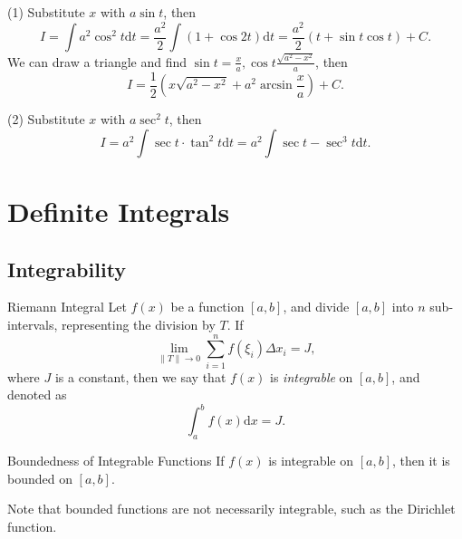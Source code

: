 \begin{solution}
  (1) Substitute $x$ with $a \sin t$, then
  \begin{equation}
    I = \int a^2 \cos^2 t \mathrm{d} t
    = \frac{a^2}{2} \int(1 + \cos 2t)\mathrm{d} t
    = \frac{a^2}{2} (t + \sin t \cos t) + C.
  \end{equation}
  We can draw a triangle and find $\sin t = \frac{x}{a}, \cos t \frac{\sqrt{a^2
      - x^2}}{a}$, then
  \begin{equation}
    I = \frac{1}{2} (x \sqrt{a^2 - x^2} + a^2 \arcsin \frac{x}{a}) + C.
  \end{equation}

  (2) Substitute $x$ with $a\sec^2 t$, then 
  \begin{equation}
    I = a^2 \int \sec t \cdot \tan^2 t \mathrm{d} t
    = a^2 \int \sec t - \sec^3 t \mathrm{d} t.
  \end{equation}
\end{solution}


\section{Definite Integrals}

\subsection{Integrability}

\begin{definition}{Riemann Integral}{}
  Let $f(x)$ be a function $[a, b]$, and divide $[a, b]$ into $n$ sub-intervals,
  representing the division by $T$.
  If
  \begin{equation}
    \lim \limits _{\|T\| \rightarrow 0} \sum\limits_{i = 1}^n f(\xi_i) \Delta x_i = J,
  \end{equation}
  where $J$ is a constant, then we say that $f(x)$ is \emph{integrable} on $[a, b]$,
  and denoted as
  \begin{equation}
    \int_a^b f(x) \mathrm{d} x = J.
  \end{equation}
\end{definition}

\begin{proposition}{Boundedness of Integrable Functions}{}
  If $f(x)$ is integrable on $[a, b]$, then it is bounded on $[a, b]$.
\end{proposition}

\begin{note}
  Note that bounded functions are not necessarily integrable, such as the
  Dirichlet function.
\end{note}

